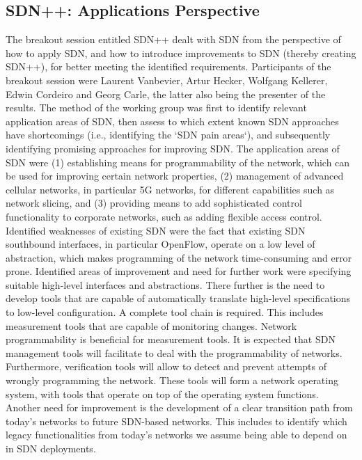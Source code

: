 \subsection{SDN++: Applications Perspective}

The breakout session entitled SDN++ dealt with SDN from the perspective of how
to apply SDN, and how to introduce improvements to SDN (thereby creating
SDN++), for better meeting the identified requirements.  Participants of the
breakout session were Laurent Vanbevier, Artur Hecker, Wolfgang Kellerer,
Edwin Cordeiro and Georg Carle, the latter also being the presenter of the
results.  The method of the working group was first to identify relevant
application areas of SDN, then assess to which extent known SDN approaches
have shortcomings (i.e., identifying the `SDN pain areas`), and subsequently
identifying promising approaches for improving SDN.  The application areas of
SDN were (1) establishing means for programmability of the network, which can
be used for improving certain network properties, (2) management of advanced
cellular networks, in particular 5G networks, for different capabilities such
as network slicing, and (3) providing means to add sophisticated control
functionality to corporate networks, such as adding flexible access control.
Identified weaknesses of existing SDN were the fact that existing SDN
southbound interfaces, in particular OpenFlow, operate on a low level of
abstraction, which makes programming of the network time-consuming and error
prone.  Identified areas of improvement and need for further work were
specifying suitable high-level interfaces and abstractions.  There further is
the need to develop tools that are capable of automatically translate
high-level specifications to low-level configuration. A complete tool chain is
required.  This includes measurement tools that are capable of monitoring
changes. Network programmability is beneficial for measurement tools.  It is
expected that SDN management tools will facilitate to deal with the
programmability of networks.  Furthermore, verification tools will allow to
detect and prevent attempts of wrongly programming the network.    These tools
will form a network operating system, with tools that operate on top of the
operating system functions.  Another need for improvement is the development
of a clear transition path from today's networks to future SDN-based networks.
This includes to identify which legacy functionalities from today's networks
we assume being able to depend on in SDN deployments.


